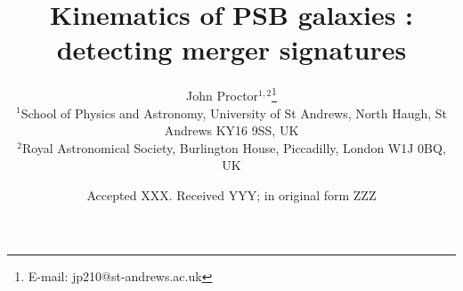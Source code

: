 \title[Kinematics of PSB galaxies]{Kinematics of PSB galaxies : detecting merger signatures} %

\author[J. Proctor]{John Proctor$^{1,2}$\thanks{E-mail: jp210@st-andrews.ac.uk}
\\
$^{1}$School of Physics and Astronomy, University of St Andrews, North Haugh, St Andrews KY16 9SS, UK\\
$^{2}$Royal Astronomical Society, Burlington House, Piccadilly, London W1J 0BQ, UK\\
}

\date{Accepted XXX. Received YYY; in original form ZZZ}



\label{firstpage}
\pagerange{\pageref{firstpage}--\pageref{lastpage}}
\maketitle